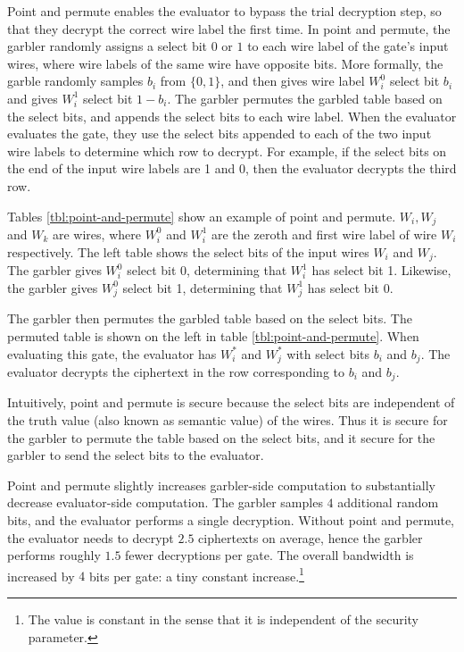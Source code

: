 Point and permute enables the evaluator to bypass the trial decryption step, so that they decrypt the correct wire label the first time.
In point and permute, the garbler randomly assigns a select bit $0$ or $1$ to each wire label of the gate's input wires, where wire labels of the same wire have opposite bits.
More formally, the garble randomly samples $b_i$ from $\{0,1\}$, and then gives wire label $W_i^0$ select bit $b_i$ and gives $W_i^1$ select bit $1-b_i$.
The garbler permutes the garbled table based on the select bits, and appends the select bits to each wire label.
When the evaluator evaluates the gate, they use the select bits appended to each of the two input wire labels to determine which row to decrypt.
For example, if the select bits on the end of the input wire labels are 1 and 0, then the evaluator decrypts the third row.

Tables \ref{tbl:point-and-permute} show an example of point and permute.
$W_i, W_j$ and $W_k$ are wires, where $W_i^0$ and $W_i^1$ are the zeroth and first wire label of wire $W_i$ respectively.
The left table shows the select bits of the input wires $W_i$ and $W_j$.
The garbler gives $W_i^0$ select bit 0, determining that $W_i^1$ has select bit 1.
Likewise, the garbler gives $W_j^0$ select bit 1, determining that $W_j^1$ has select bit 0.

The garbler then permutes the garbled table based on the select bits. 
The permuted table is shown on the left in table \ref{tbl:point-and-permute}.
When evaluating this gate, the evaluator has $W_i^*$ and $W_j^*$ with select bits $b_i$ and $b_j$.
The evaluator decrypts the ciphertext in the row corresponding to $b_i$ and $b_j$.

Intuitively, point and permute is secure because the select bits are independent of the truth value (also known as semantic value) of the wires.
Thus it is secure for the garbler to permute the table based on the select bits, and it secure for the garbler to send the select bits to the evaluator.

Point and permute slightly increases garbler-side computation to substantially decrease evaluator-side computation.
The garbler samples $4$ additional random bits, and the evaluator performs a single decryption.
Without point and permute, the evaluator needs to decrypt $2.5$ ciphertexts on average, hence the garbler performs roughly $1.5$ fewer decryptions per gate.
The overall bandwidth is increased by $4$ bits per gate: a tiny constant increase.\footnote{The value is constant in the sense that it is independent of the security parameter.}

